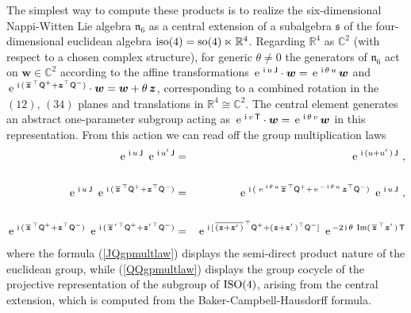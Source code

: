 \documentclass[11pt,a4paper]{article}
\newcommand{\ii}{{\rm i}}
\newcommand{\mbf}[1]{{\boldsymbol {#1} }}
\def\ii{{\,{\rm i}\,}}
\def\T{{\sf T}}
\def\Q{{\sf Q}}
\def\J{{\sf J}}
\def\mz{{\mbf z}}
\def\mw{{\mbf w}}
\def\mfn{{\mathfrak n}}
\def\mfs{{\mathfrak s}}
\newcommand{\complex}{{\mathbb C}} %
\newcommand{\real}{{\mathbb R}} %
\def\nn{\nonumber}
\def\e{{\,\rm e}\,}
\def\bea{\begin{eqnarray}}
\def\eea{\end{eqnarray}}
\begin{document}
The simplest way to compute these products is to realize the
six-dimensional Nappi-Witten Lie algebra $\mfn_6$ as a central
extension of a subalgebra $\mfs$ of the four-dimensional euclidean algebra
${\rm iso}(4)={\rm so}(4)\ltimes\real^4$. Regarding $\real^4$ as
$\complex^2$ (with respect to a chosen complex structure), for generic
$\theta\neq0$ the generators of $\mfn_6$ act on $\mw\in\complex^2$
according to the affine transformations $\e^{\ii
  u\,\J}\cdot\mw=\e^{\ii\theta\,u}\,\mw$ and
$\e^{\ii(\,\overline{\mz}^{\,\top}\Q^++\mz^\top\Q^-)}\cdot\mw=\mw+\theta\,\mz$,
corresponding to a combined rotation in the $(12)$, $(34)$ planes and
translations in $\real^4\cong\complex^2$. The central element
generates an abstract one-parameter subgroup acting as $\e^{\ii
  v\,\T}\cdot\mw=\e^{\ii\theta\,v}\,\mw$ in this representation. From
this action we can read off the group multiplication laws
\bea
\e^{\ii u\,\J}~\e^{\ii u'\,\J}&=&\e^{\ii(u+u'\,)\,\J} \ ,
\label{JJgpmultlaw}\\
{~~~~}^{~~}_{~~}\nn\\\e^{\ii u\,\J}~\e^{\ii(\,\overline{\mz}^{\,\top}\Q^+
+\mz^\top\Q^-)}&=&\e^{\ii(\,\e^{\ii\theta\,u}\,\overline{\mz}^{\,\top}\Q^+
+\e^{-\ii\theta\,u}\,\mz^\top\Q^-)}~\e^{\ii u\,\J} \ ,
\label{JQgpmultlaw}\\
{~~~~}^{~~}_{~~}\nn\\\e^{\ii(\,\overline{\mz}^{\,\top}\Q^+
+\mz^\top\Q^-)}~\e^{\ii(\,\overline{\mz}^{\,\prime\,\top}\Q^+
+\mz^{\prime\,\top}\Q^-)}&=&\e^{\ii[\,\overline{(\mz+\mz'\,)}^{\,\top}\Q^+
+(\mz+\mz'\,)^{\top}\Q^-]}~\e^{-2\ii\theta~{\rm Im}(\,
\overline{\mz}^{\,\top}\mz'\,)\,\T}
\label{QQgpmultlaw}\eea
where the formula (\ref{JQgpmultlaw}) displays the semi-direct product
nature of the euclidean group, while (\ref{QQgpmultlaw}) displays the
group cocycle of the projective representation of the subgroup of
${\rm ISO}(4)$, arising from the central extension, which is computed
from the Baker-Campbell-Hausdorff formula.
\end{document}
